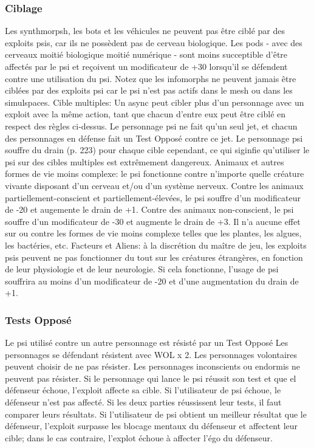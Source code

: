 \subsubsection{Ciblage} 

Les synthmorpsh, les bots et les véhicules ne peuvent pas être ciblé par des exploits psis, car ils ne possèdent pas de cerveau biologique. Les pods - avec des cerveaux moitié biologique moitié numérique - sont moins succeptible d'être affectés par le psi et reçoivent un modificateur de +30 lorsqu'il se défendent contre une utilisation du psi. Notez que les infomorphs ne peuvent jamais être ciblées par des exploits psi car le psi n'est pas actifs dans le mesh ou dans les simulspaces. Cible multiples: Un async peut cibler plus d'un personnage avec un exploit avec la même action, tant que chacun d'entre eux peut être ciblé en respect des règles ci-dessus. Le personnage psi ne fait qu'un seul jet, et chacun des personnages en défense fait un Test Opposé contre ce jet. Le personnage psi souffre du drain (p. 223) pour chaque cible cependant, ce qui siginfie qu'utiliser le psi sur des cibles multiples est extrêmement dangereux. Animaux et autres formes de vie moins complexe: le psi fonctionne contre n'importe quelle créature vivante disposant d'un cerveau et/ou d'un système nerveux. Contre les animaux partiellement-conscient et partiellement-élevées, le psi souffre d'un modificateur de -20 et augemente le drain de +1. Contre des animaux non-conscient, le psi souffre d'un modificateur de -30 et augmente le drain de +3. Il n'a aucune effet sur ou contre les formes de vie moins complexe telles que les plantes, les algues, les bactéries, etc. Facteurs et Aliens: à la discrétion du maître de jeu, les exploits psis peuvent ne pas fonctionner du tout sur les créatures étrangères, en fonction de leur physiologie et de leur neurologie. Si cela fonctionne, l'usage de psi souffrira au moins d'un modificateur de -20 et d'une augmentation du drain de +1. 

\subsubsection{Tests Opposé} 

Le psi utilisé contre un autre personnage est résisté par un Test Opposé Les personnages se défendant résistent avec WOL x 2. Les personnages volontaires peuvent choisir de ne pas résister. Les personnages inconscients ou endormis ne peuvent pas résister. Si le personnage qui lance le psi réussit son test et que el défenseur échoue, l'exploit affecte sa cible. Si l'utilisateur de psi échoue, le défenseur n'est pas affecté. Si les deux parties réussissent leur tests, il faut comparer leurs résultats. Si l'utilisateur de psi obtient un meilleur résultat que le défenseur, l'exploit surpasse les blocage mentaux du défenseur et affectent leur cible; dans le cas contraire, l'explot échoue à affecter l'égo du défenseur. 

